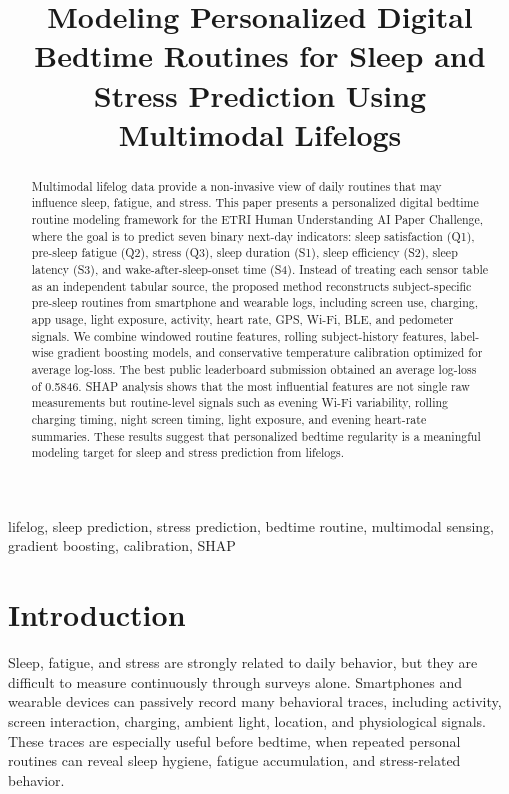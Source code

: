\documentclass[conference]{IEEEtran}
\title{Modeling Personalized Digital Bedtime Routines for Sleep and Stress Prediction Using Multimodal Lifelogs}
\author{
\IEEEauthorblockN{Junghee Young}
\IEEEauthorblockA{
Independent Researcher\\
Email: your.email@example.com}
}
\begin{document}
\maketitle

\begin{abstract}
Multimodal lifelog data provide a non-invasive view of daily routines that may influence sleep, fatigue, and stress. This paper presents a personalized digital bedtime routine modeling framework for the ETRI Human Understanding AI Paper Challenge, where the goal is to predict seven binary next-day indicators: sleep satisfaction (Q1), pre-sleep fatigue (Q2), stress (Q3), sleep duration (S1), sleep efficiency (S2), sleep latency (S3), and wake-after-sleep-onset time (S4). Instead of treating each sensor table as an independent tabular source, the proposed method reconstructs subject-specific pre-sleep routines from smartphone and wearable logs, including screen use, charging, app usage, light exposure, activity, heart rate, GPS, Wi-Fi, BLE, and pedometer signals. We combine windowed routine features, rolling subject-history features, label-wise gradient boosting models, and conservative temperature calibration optimized for average log-loss. The best public leaderboard submission obtained an average log-loss of 0.5846. SHAP analysis shows that the most influential features are not single raw measurements but routine-level signals such as evening Wi-Fi variability, rolling charging timing, night screen timing, light exposure, and evening heart-rate summaries. These results suggest that personalized bedtime regularity is a meaningful modeling target for sleep and stress prediction from lifelogs.
\end{abstract}

\begin{IEEEkeywords}
lifelog, sleep prediction, stress prediction, bedtime routine, multimodal sensing, gradient boosting, calibration, SHAP
\end{IEEEkeywords}

\section{Introduction}
Sleep, fatigue, and stress are strongly related to daily behavior, but they are difficult to measure continuously through surveys alone. Smartphones and wearable devices can passively record many behavioral traces, including activity, screen interaction, charging, ambient light, location, and physiological signals. These traces are especially useful before bedtime, when repeated personal routines can reveal sleep hygiene, fatigue accumulation, and stress-related behavior.
\end{document}
